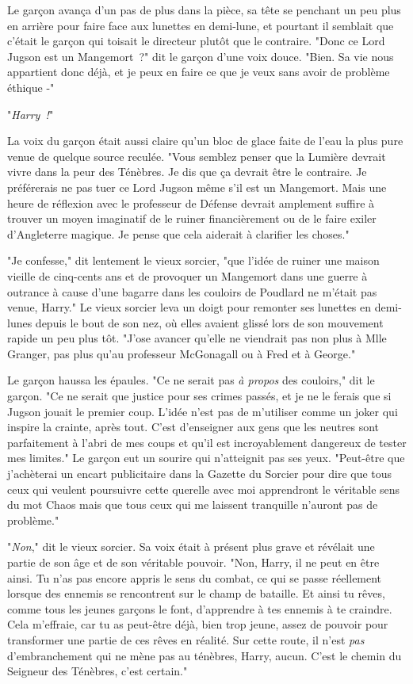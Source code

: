 Le garçon avança d'un pas de plus dans la pièce, sa tête se penchant un peu plus en arrière pour faire face aux lunettes en demi-lune, et pourtant il semblait que c'était le garçon qui toisait le directeur plutôt que le contraire. "Donc ce Lord Jugson est un Mangemort~?" dit le garçon d'une voix douce. "Bien. Sa vie nous appartient donc déjà, et je peux en faire ce que je veux sans avoir de problème éthique -"

"\emph{Harry~!}"

La voix du garçon était aussi claire qu'un bloc de glace faite de l'eau la plus pure venue de quelque source reculée. "Vous semblez penser que la Lumière devrait vivre dans la peur des Ténèbres. Je dis que ça devrait être le contraire. Je préférerais ne pas tuer ce Lord Jugson même s'il est un Mangemort. Mais une heure de réflexion avec le professeur de Défense devrait amplement suffire à trouver un moyen imaginatif de le ruiner financièrement ou de le faire exiler d'Angleterre magique. Je pense que cela aiderait à clarifier les choses."

"Je confesse," dit lentement le vieux sorcier, "que l'idée de ruiner une maison vieille de cinq-cents ans et de provoquer un Mangemort dans une guerre à outrance à cause d'une bagarre dans les couloirs de Poudlard ne m'était pas venue, Harry." Le vieux sorcier leva un doigt pour remonter ses lunettes en demi-lunes depuis le bout de son nez, où elles avaient glissé lors de son mouvement rapide un peu plus tôt. "J'ose avancer qu'elle ne viendrait pas non plus à Mlle Granger, pas plus qu'au professeur McGonagall ou à Fred et à George."

Le garçon haussa les épaules. "Ce ne serait pas \emph{à propos} des couloirs," dit le garçon. "Ce ne serait que justice pour ses crimes passés, et je ne le ferais que si Jugson jouait le premier coup. L'idée n'est pas de m'utiliser comme un joker qui inspire la crainte, après tout. C'est d'enseigner aux gens que les neutres sont parfaitement à l'abri de mes coups et qu'il est incroyablement dangereux de tester mes limites." Le garçon eut un sourire qui n'atteignit pas ses yeux. "Peut-être que j'achèterai un encart publicitaire dans la Gazette du Sorcier pour dire que tous ceux qui veulent poursuivre cette querelle avec moi apprendront le véritable sens du mot Chaos mais que tous ceux qui me laissent tranquille n'auront pas de problème."

"\emph{Non}," dit le vieux sorcier. Sa voix était à présent plus grave et révélait une partie de son âge et de son véritable pouvoir. "Non, Harry, il ne peut en être ainsi. Tu n'as pas encore appris le sens du combat, ce qui se passe réellement lorsque des ennemis se rencontrent sur le champ de bataille. Et ainsi tu rêves, comme tous les jeunes garçons le font, d'apprendre à tes ennemis à te craindre. Cela m'effraie, car tu as peut-être déjà, bien trop jeune, assez de pouvoir pour transformer une partie de ces rêves en réalité. Sur cette route, il n'est \emph{pas} d'embranchement qui ne mène pas au ténèbres, Harry, aucun. C'est le chemin du Seigneur des Ténèbres, c'est certain."

